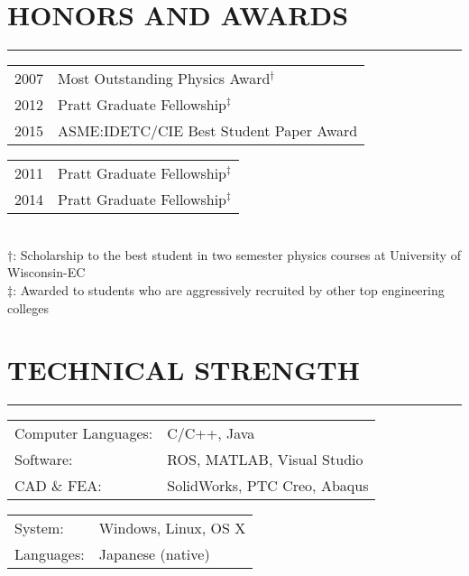 \documentclass[10pt,letterpaper]{article}
\begin{document}
\section*{HONORS AND AWARDS}
\vspace{-2mm}
\hrule
\hspace{10mm}
\begin{minipage}{\columnwidth}
\begin{minipage}{0.5\columnwidth}
\begin{tabular}{l l}
2007 & Most Outstanding Physics Award$^\dagger$ \\
2012 & Pratt Graduate Fellowship$^\ddagger$\\
2015 & ASME:IDETC/CIE Best Student Paper Award\\
\end{tabular}
\end{minipage}
\begin{minipage}{0.5\columnwidth}
\begin{tabular}{l l}
2011 & Pratt Graduate Fellowship$^\ddagger$ \\
2014 & Pratt Graduate Fellowship$^\ddagger$\\ 
\end{tabular}
\end{minipage}
\\
\vspace{5mm}
$\dagger$: Scholarship to the best student in two semester physics courses at University of Wisconsin-EC\\
$\ddagger$: Awarded to students who are aggressively recruited by other top engineering colleges\\
\end{minipage}

\vspace{-5mm}
\section*{TECHNICAL STRENGTH}
\vspace{-2mm}
\hrule
\hspace{10mm}
\begin{minipage}{0.9\columnwidth}
\begin{minipage}{0.4\columnwidth}
\begin{tabular}{ll}
Computer Languages: & C/C++, Java\\
Software: & ROS, MATLAB, Visual Studio \\
CAD \& FEA: & SolidWorks, PTC Creo, Abaqus\\
\end{tabular}
\end{minipage}
\hfill
\begin{minipage}{0.4\columnwidth}
\begin{tabular}{ll}
System: & Windows, Linux, OS X\\
Languages: & Japanese (native)\\
\end{tabular}
\end{minipage}
\end{minipage}
\end{document}
